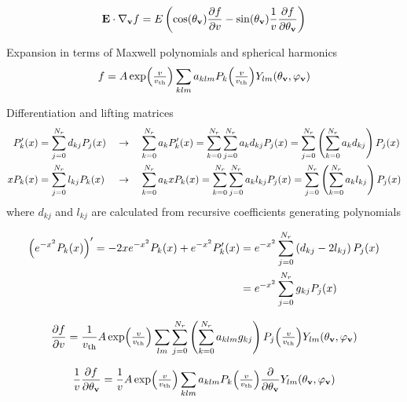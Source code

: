 \documentclass{article}
\newcommand{\vect}[1]{\mathbf{#1}}
\newcommand{\of}[1]{\mleft( #1 \mright)}
\newcommand{\vth}{v_\textrm{th}}
\begin{document}
\begin{align*}
\vect{E}\cdot \nabla_{\vect{v}} f
= E 
\left( \cos\of{\theta_\vect{v}} \frac{\partial f}{\partial v} 
- \sin\of{\theta_\vect{v}} \frac{1}{v} \frac{\partial f}{\partial \vect{\theta}_{\vect{v}}} \right)
\end{align*}

Expansion in terms of Maxwell polynomials and spherical harmonics
\begin{align*}
f = A \exp\of{\textstyle\frac{v}{\vth}} \sum_{klm} a_{klm} P_k\of{\textstyle\frac{v}{\vth}} Y_{lm}\of{\theta_{\vect{v}},\varphi_{\vect{v}}}
\end{align*}

Differentiation and lifting matrices
\begin{align*}
P^\prime_k\of{x} &= \sum_{j=0}^{N_r} d_{kj} P_j\of{x}
&
&\rightarrow \quad
\sum_{k=0}^{N_r} a_k P^\prime_k\of{x} 
= \sum_{k=0}^{N_r} \sum_{j=0}^{N_r} a_k d_{kj} P_j\of{x}
= \sum_{j=0}^{N_r} \left( \sum_{k=0}^{N_r}  a_k d_{kj} \right) P_j\of{x}
\\
x P_k\of{x} &= \sum_{j=0}^{N_r} l_{kj} P_k\of{x}
&
&\rightarrow \quad
\sum_{k=0}^{N_r} a_k x P_k\of{x} 
= \sum_{k=0}^{N_r} \sum_{j=0}^{N_r} a_k l_{kj} P_j\of{x}
= \sum_{j=0}^{N_r} \left( \sum_{k=0}^{N_r}  a_k l_{kj} \right) P_j\of{x}
\end{align*}
where $d_{kj}$ and $l_{kj}$ are calculated from recursive coefficients generating polynomials

\begin{align*}
\left( e^{-x^2} P_k\of{x} \right)^\prime
= - 2 x e^{-x^2} P_k\of{x} + e^{-x^2} P^\prime_k\of{x}
&= e^{-x^2} \sum_{j=0}^{N_r} \left( d_{kj} - 2 l_{kj} \right)P_j\of{x}
\\
&= e^{-x^2} \sum_{j=0}^{N_r} g_{kj} P_j\of{x}
\end{align*}

\begin{align*}
\frac{\partial f}{\partial v}
=
\frac{1}{\vth}
A \exp\of{\textstyle\frac{v}{\vth}} \sum_{lm} \sum_{j=0}^{N_r} \left(\sum_{k=0}^{N_r} a_{klm} g_{kj} \right) P_j\of{\textstyle\frac{v}{\vth}} Y_{lm}\of{\theta_{\vect{v}},\varphi_{\vect{v}}}
\end{align*}

\begin{align*}
\frac{1}{v}\frac{\partial f}{\partial \vect{\theta}_{\vect{v}}}
=
\frac{1}{v} A \exp\of{\textstyle\frac{v}{\vth}} \sum_{klm} a_{klm} P_k\of{\textstyle\frac{v}{\vth}} \frac{\partial }{\partial \vect{\theta}_{\vect{v}}} Y_{lm}\of{\theta_{\vect{v}},\varphi_{\vect{v}}}
\end{align*}
\end{document}
